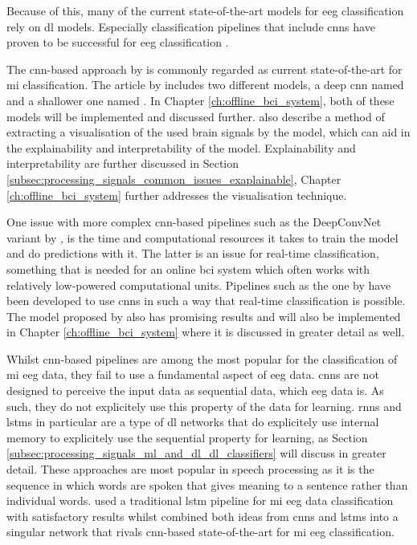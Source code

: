 Because of this, many of the current state-of-the-art models for \gls{eeg} classification rely on \gls{dl} models.
Especially classification pipelines that include \glspl{cnn} have proven to be successful for \gls{eeg} classification \citep{fbcnet, eeg_mi_model_mussi, eeg_mi_model_deep_cnn_spatial_filters, eeg_model_hbm, eeg_model_esi, eeg_model_eegnet}.

The \gls{cnn}-based approach by \citet{eeg_model_hbm} is commonly regarded as current state-of-the-art for \gls{mi} classification.
The article by \citet{eeg_model_hbm} includes two different models, a deep \gls{cnn} named  and a shallower one named .
In Chapter \ref{ch:offline_bci_system}, both of these models will be implemented and discussed further.
 also describe a method of extracting a visualisation of the used brain signals by the model, which can aid in the explainability and interpretability of the model.
Explainability and interpretability are further discussed in Section \ref{subsec:processing_signals_common_issues_exaplainable}, Chapter \ref{ch:offline_bci_system} further addresses the visualisation technique.

One issue with more complex \gls{cnn}-based pipelines such as the DeepConvNet variant by \citet{eeg_model_hbm}, is the time and computational resources it takes to train the model and do predictions with it.
The latter is an issue for real-time classification, something that is needed for an online \gls{bci} system which often works with relatively low-powered computational units.
Pipelines such as the one by \citet{eeg_model_eegnet} have been developed to use \glspl{cnn} in such a way that real-time classification is possible.
The model proposed by \citet{eeg_model_eegnet} also has promising results and will also be implemented in Chapter \ref{ch:offline_bci_system} where it is discussed in greater detail as well.

Whilst \gls{cnn}-based pipelines are among the most popular for the classification of \gls{mi} \gls{eeg} data, they fail to use a fundamental aspect of \gls{eeg} data.
\Glspl{cnn} are not designed to perceive the input data as sequential data, which \gls{eeg} data is.
As such, they do not explicitely use this property of the data for learning.
\Glspl{rnn} and \glspl{lstm} in particular are a type of \gls{dl} networks that do explicitely use internal memory to explicitely use the sequential property for learning, as Section \ref{subsec:processing_signals_ml_and_dl_dl_classifiers} will discuss in greater detail.
These approaches are most popular in speech processing as it is the sequence in which words are spoken that gives meaning to a sentence rather than individual words.
 used a traditional \gls{lstm} pipeline for \gls{mi} \gls{eeg} data classification with satisfactory results whilst \citet{lstm_cnn_mi_eeg} combined both ideas from \glspl{cnn} and \glspl{lstm} into a singular network that rivals \gls{cnn}-based state-of-the-art for \gls{mi} \gls{eeg} classification.

